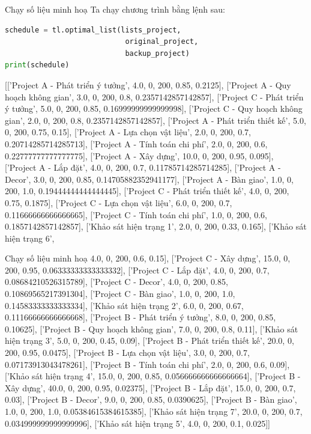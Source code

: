 \documentclass[10pt]{beamer}
\begin{document}
\begin{frame}[fragile]{Chạy số liệu minh hoạ}
Ta chạy chương trình bằng lệnh sau:
\begin{lstlisting}[language=Python]
schedule = tl.optimal_list(lists_project,
                            original_project,
                            backup_project)
print(schedule)
\end{lstlisting}

{\scriptsize [['Project A - Phát triển ý tưởng', 4.0, 0, 200, 0.85, 0.2125], ['Project A - Quy hoạch không gian', 3.0, 0, 200, 0.8, 0.2357142857142857], ['Project C - Phát triển ý tưởng', 5.0, 0, 200, 0.85, 0.16999999999999998], ['Project C - Quy hoạch không gian', 2.0, 0, 200, 0.8, 0.2357142857142857], ['Project A - Phát triển thiết kế', 5.0, 0, 200, 0.75, 0.15], ['Project A - Lựa chọn vật liệu', 2.0, 0, 200, 0.7, 0.20714285714285713], ['Project A - Tính toán chi phí', 2.0, 0, 200, 0.6, 0.22777777777777775], ['Project A - Xây dựng', 10.0, 0, 200, 0.95, 0.095], ['Project A - Lắp đặt', 4.0, 0, 200, 0.7, 0.11785714285714285], ['Project A - Decor', 3.0, 0, 200, 0.85, 0.14705882352941177], ['Project A - Bàn giao', 1.0, 0, 200, 1.0, 0.19444444444444445], ['Project C - Phát triển thiết kế', 4.0, 0, 200, 0.75, 0.1875], ['Project C - Lựa chọn vật liệu', 6.0, 0, 200, 0.7, 0.11666666666666665], ['Project C - Tính toán chi phí', 1.0, 0, 200, 0.6, 0.1857142857142857], ['Khảo sát hiện trạng 1', 2.0, 0, 200, 0.33, 0.165], ['Khảo sát hiện trạng 6',
}
    
\end{frame}

\begin{frame}{Chạy số liệu minh hoạ}
\footnotesize
4.0, 0, 200, 0.6, 0.15], ['Project C - Xây dựng', 15.0, 0, 200, 0.95, 0.06333333333333332], ['Project C - Lắp đặt', 4.0, 0, 200, 0.7, 0.08684210526315789], ['Project C - Decor', 4.0, 0, 200, 0.85, 0.10869565217391304], ['Project C - Bàn giao', 1.0, 0, 200, 1.0, 0.14583333333333334], ['Khảo sát hiện trạng 2', 6.0, 0, 200, 0.67, 0.11166666666666668], ['Project B - Phát triển ý tưởng', 8.0, 0, 200, 0.85, 0.10625], ['Project B - Quy hoạch không gian', 7.0, 0, 200, 0.8, 0.11], ['Khảo sát hiện trạng 3', 5.0, 0, 200, 0.45, 0.09], ['Project B - Phát triển thiết kế', 20.0, 0, 200, 0.95, 0.0475], ['Project B - Lựa chọn vật liệu', 3.0, 0, 200, 0.7, 0.07173913043478261], ['Project B - Tính toán chi phí', 2.0, 0, 200, 0.6, 0.09], ['Khảo sát hiện trạng 4', 15.0, 0, 200, 0.85, 0.056666666666666664], ['Project B - Xây dựng', 40.0, 0, 200, 0.95, 0.02375], ['Project B - Lắp đặt', 15.0, 0, 200, 0.7, 0.03], ['Project B - Decor', 9.0, 0, 200, 0.85, 0.0390625], ['Project B - Bàn giao', 1.0, 0, 200, 1.0, 0.05384615384615385], ['Khảo sát hiện trạng 7', 20.0, 0, 200, 0.7, 0.034999999999999996], ['Khảo sát hiện trạng 5', 4.0, 0, 200, 0.1, 0.025]]
\end{frame}
\end{document}
